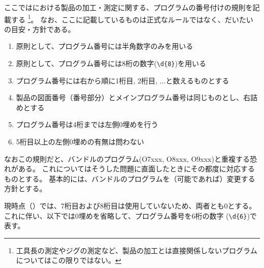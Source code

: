 

ここでは\DMname における製品の加工・測定に関する、プログラムの番号付けの規則を記載する
\footnote{工具長の測定やジグの測定など、製品の加工とは直接関係しないプログラムについてはこの限りではない。}。
なお、ここに記載しているものは正式なルールではなく、だいたいの目安・方針である。
\begin{enumerate}[label=\Roman*., ref=\Roman*)]
\item 原則として、プログラム番号には半角数字のみを用いる
\item 原則として、プログラム番号には8桁の数字(\verb|\d{8}|)を用いる
\item プログラム番号には右から順に1桁目, 2桁目, ...と数えるものとする
\item 製品の図面番号（番号部分）とメインプログラム番号は同じものとし、右詰めとする
\item プログラム番号は4桁までは左側0埋めを行う
\item 5桁目以上の左側0埋めの有無は問わない
\end{enumerate}
なおこの規則だと、バンドルのプログラム(O7xxx, O8xxx, O9xxx)と重複する恐れがある。
これについてはそうした問題に直面したときにその都度に対応するものとする。
基本的には、バンドルのプログラムを（可能であれば）変更する方針とする。



現時点（\customtodayap）では、7桁目および8桁目は使用していないため、両者とも0とする。
これに伴い、以下では0埋めを省略して、プログラム番号を6桁の数字 (\verb|\d{6}|)で表す。


